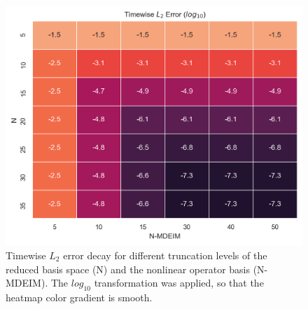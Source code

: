 \documentclass[../../thesis.tex]{subfiles}
\begin{document}
\begin{figure}[h]
    \centering
    \includegraphics[width=1\columnwidth]{research_project/piston/figures/mdeim_certification/error_decay_heatmap.png}
    \caption{Timewise $L_2$ error decay for different truncation levels 
    of the reduced basis space (N) 
    and the nonlinear operator basis (N-MDEIM).
    The $log_{10}$ transformation was applied, so that the heatmap color gradient is smooth.}
    \label{fig:nonlinear_error_decay_heatmap}
\end{figure}
\end{document}
